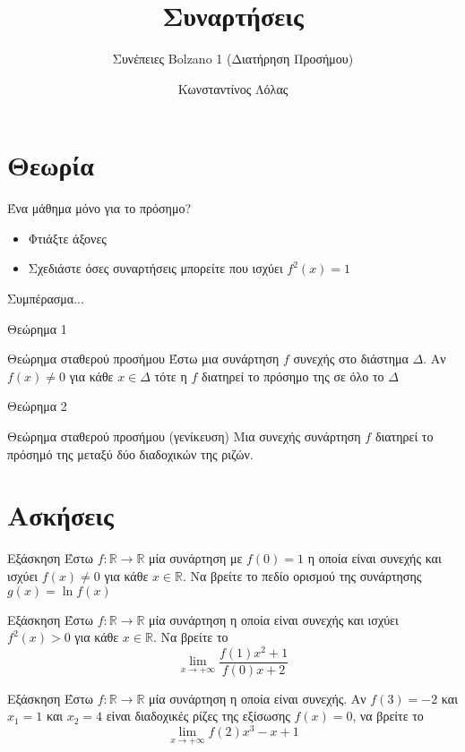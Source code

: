 \documentclass[greek]{beamer}
\title{Συναρτήσεις}
\subtitle{Συνέπειες Bolzano 1 (Διατήρηση Προσήμου)}
\author[Λόλας]{Κωνσταντίνος Λόλας}
\date{}
\begin{document}
\begin{frame}
 \titlepage
\end{frame}

\section{Θεωρία}
\begin{frame}{Ένα μάθημα μόνο για το πρόσημο?}
 \begin{itemize}
  \item Φτιάξτε άξονες \pause
  \item Σχεδιάστε όσες συναρτήσεις μπορείτε που ισχύει $f^2(x)=1$ \pause
 \end{itemize}
 Συμπέρασμα...
\end{frame}

\begin{frame}{Θεώρημα 1}
 \begin{block}{Θεώρημα σταθερού προσήμου}
  Έστω μια συνάρτηση $f$ συνεχής στο διάστημα $Δ$. Αν $f(x)\ne 0$ για κάθε $x\in Δ$ τότε η $f$ διατηρεί το πρόσημο της σε όλο το $Δ$
 \end{block}
\end{frame}

\begin{frame}{Θεώρημα 2}
 \begin{block}{Θεώρημα σταθερού προσήμου (γενίκευση)}
  Μια συνεχής συνάρτηση $f$ διατηρεί το πρόσημό της μεταξύ δύο διαδοχικών της ριζών.
 \end{block}
\end{frame}

\section{Ασκήσεις}
\begin{frame}{Εξάσκηση}
 Έστω $f:\mathbb{R}\to\mathbb{R}$ μία συνάρτηση με $f(0)=1$ η οποία είναι συνεχής και ισχύει $f(x)\ne 0$ για κάθε $x\in\mathbb{R}$. Να βρείτε το πεδίο ορισμού της συνάρτησης $g(x)=\ln f(x)$
\end{frame}

\begin{frame}{Εξάσκηση}
 Έστω $f:\mathbb{R}\to\mathbb{R}$ μία συνάρτηση η οποία είναι συνεχής και ισχύει $f^2(x)>0$ για κάθε $x\in\mathbb{R}$. Να βρείτε το
 $$\lim\limits_{x \to +\infty}{ \frac{f(1)x^2+1}{f(0)x+2} }$$
\end{frame}

\begin{frame}{Εξάσκηση}
 Έστω $f:\mathbb{R}\to\mathbb{R}$ μία συνάρτηση η οποία είναι συνεχής. Αν $f(3)=-2$ και $x_1=1$ και $x_2=4$ είναι διαδοχικές ρίζες της εξίσωσης $f(x)=0$, να βρείτε το
 $$\lim\limits_{x \to +\infty}{ f(2)x^3-x+1 }$$
\end{frame}
\end{document}
